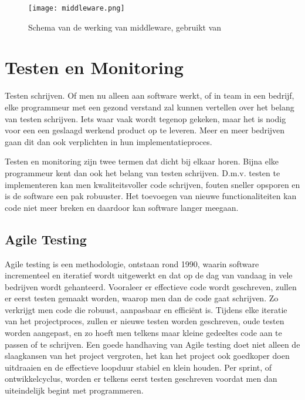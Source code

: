 \begin{figure}[h]
	\texttt{[image: middleware.png]}
	\caption{Schema van de werking van middleware, gebruikt van \cite{middleware}}
	\label{fig:middleware}
\end{figure}

\section{Testen en Monitoring}
\label{sec:testAndMonitoring}

Testen schrijven. Of men nu alleen aan software werkt, of in team in een bedrijf, elke programmeur met een gezond verstand zal kunnen vertellen over het belang van testen schrijven. Iets waar vaak wordt tegenop gekeken, maar het is nodig voor een een geslaagd werkend product op te leveren. Meer en meer bedrijven gaan dit dan ook verplichten in hun implementatieproces. 

Testen en monitoring zijn twee termen dat dicht bij elkaar horen. Bijna elke programmeur kent dan ook het belang van testen schrijven. D.m.v. testen te implementeren kan men kwaliteitsvoller code schrijven, fouten sneller opsporen en is de software een pak robuuster. Het toevoegen van nieuwe functionaliteiten kan code niet meer breken en daardoor kan software langer meegaan. 

\subsection{Agile Testing}
\label{sec:agile}

Agile testing is een methodologie, ontstaan rond 1990, waarin software incrementeel en iteratief wordt uitgewerkt en dat op de dag van vandaag in vele bedrijven wordt gehanteerd. Vooraleer er effectieve code wordt geschreven, zullen er eerst testen gemaakt worden, waarop men dan de code gaat schrijven. Zo verkrijgt men code die robuust, aanpasbaar en efficiënt is. Tijdens elke iteratie van het projectproces, zullen er nieuwe testen worden geschreven, oude testen worden aangepast, en zo hoeft men telkens maar kleine gedeeltes code aan te passen of te schrijven. Een goede handhaving van Agile testing doet niet alleen de slaagkansen van het project vergroten, het kan het project ook goedkoper doen uitdraaien en de effectieve loopduur stabiel en klein houden.
Per sprint, of ontwikkelcyclus, worden er telkens eerst testen geschreven voordat men dan uiteindelijk begint met programmeren. \autocite{CHAKRAVORTY2014536}

